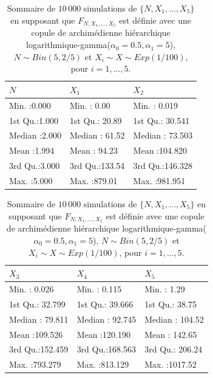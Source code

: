 \documentclass{article}
\begin{document}
		\begin{table}[H]
			\centering
			\begin{tabular}{lll}
				\hline
				       $N$ &       $X_1$ &       $X_2$        \\ 
				\hline
				 Min.   :0.000   & Min.   :  0.00   & Min.   :  0.019     \\ 
				 1st Qu.:1.000   & 1st Qu.: 20.89   & 1st Qu.: 30.541    \\ 
				 Median :2.000   & Median : 61.52   & Median : 73.503    \\ 
				 Mean   :1.994   & Mean   : 94.23   & Mean   :104.820    \\ 
				 3rd Qu.:3.000   & 3rd Qu.:133.54   & 3rd Qu.:146.328    \\ 
				 Max.   :5.000   & Max.   :879.01   & Max.   :981.951     \\ 
				\hline
			\end{tabular}
			\begin{tabular}{lll}
				\hline
				          $X_3$ &       $X_4$ &       $X_5$ \\ 
				\hline
				 Min.   :  0.026   & Min.   :  0.115   & Min.   :   1.29   \\ 
				 1st Qu.: 32.799   & 1st Qu.: 39.666   & 1st Qu.:  38.75   \\ 
				 Median : 79.811   & Median : 92.745   & Median : 104.52   \\ 
				 Mean   :109.526   & Mean   :120.190   & Mean   : 142.65   \\ 
				 3rd Qu.:152.459   & 3rd Qu.:168.563   & 3rd Qu.: 206.24   \\ 
				 Max.   :793.279   & Max.   :813.129   & Max.   :1017.52   \\ 
				\hline
			\end{tabular}
		\caption[Sommaire des données simulées pour le scénario \ref{scenario_log_gamma}]{Sommaire de $10\,000$ simulations de $\{N, X_1, \dots, X_5\}$ en supposant que $F_{N,X_1,\dots, X_5}$ est définie avec une copule de archimédienne hiérarchique logarithmique-gamma($\alpha_0=0.5, \alpha_1 = 5$), $N \sim Bin(5, 2/5)$ et $X_i \sim X \sim Exp(1/100)$, pour $i=1,\dots, 5$.}
		\label{tbl_sommaire_log_gamma}
		\end{table}
		
\end{document}
